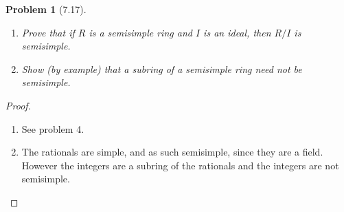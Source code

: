\documentclass[10pt]{article}
\newcommand{\sk}{\vskip 10mm}
\theoremstyle{plain}
\newtheorem{problem}{Problem}
\theoremstyle{remark}
\begin{document}
\sk

\begin{problem}[7.17]
  \begin{enumerate}
  \item[(a)] Prove that if $R$ is a semisimple ring and $I$ is an ideal,
    then $R/I$ is semisimple.
  \item[(b)] Show (by example) that a subring of a semisimple ring need
    not be semisimple.
  \end{enumerate}
\end{problem}

\begin{proof}
  \begin{enumerate}
  \item[(a)] See problem 4.
  \item[(b)] The rationals are simple, and as such semisimple, since they are
    a field. However the integers are a subring of the rationals and
    the integers are not semisimple.
  \end{enumerate}
\end{proof}

\end{document}
